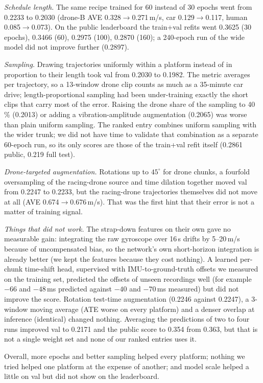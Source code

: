 \documentclass[letterpaper,10pt,conference]{ieeeconf}
\begin{document}
\emph{Schedule length.} The same recipe trained for 60 instead of 30 epochs went from 0.2233 to 0.2030 (drone-B AVE
0.328$\to$0.271\,m/s, car 0.129$\to$0.117, human 0.085$\to$0.073). On the public leaderboard the train+val refits
went 0.3625 (30 epochs), 0.3466 (60), 0.2975 (100), 0.2870 (160); a 240-epoch run of the wide model did not improve
further (0.2897).

\emph{Sampling.} Drawing trajectories uniformly within a platform instead of in proportion to their length took val
from 0.2030 to 0.1982. The metric averages per trajectory, so a 13-window drone clip counts as much as a 35-minute
car drive; length-proportional sampling had been under-training exactly the short clips that carry most of the error.
Raising the drone share of the sampling to 40\,\% (0.2013) or adding a vibration-amplitude augmentation (0.2065) was
worse than plain uniform sampling. The ranked entry combines uniform sampling with the wider trunk; we did not have time to validate
that combination as a separate 60-epoch run, so its only scores are those of the train+val refit itself (0.2861 public,
0.219 full test).

\emph{Drone-targeted augmentation.} Rotations up to $45^\circ$ for drone chunks, a fourfold oversampling of the
racing-drone source and time dilation together moved val from 0.2247 to 0.2233, but the racing-drone trajectories
themselves did not move at all (AVE 0.674$\to$0.676\,m/s). That was the first hint that their error is not a matter
of training signal.

\emph{Things that did not work.} The strap-down features on their own gave no measurable gain: integrating the raw
gyroscope over 16\,s drifts by 5--20\,m/s because of uncompensated bias, so the network's own short-horizon
integration is already better (we kept the features because they cost nothing). A learned per-chunk time-shift
head, supervised with IMU-to-ground-truth offsets we measured on the training set, predicted the offsets of unseen
recordings well (for example $-66$ and $-48$\,ms predicted against $-40$ and $-70$\,ms measured) but did not improve
the score. Rotation test-time augmentation (0.2246 against 0.2247), a 3-window moving average (ATE worse on every
platform) and a denser overlap at inference (identical) changed nothing. Averaging the predictions of two to four
runs improved val to 0.2171 and the public score to 0.354 from 0.363, but that is not a single weight set and none of
our ranked entries uses it.

Overall, more epochs and better sampling helped every platform; nothing we tried helped one platform at the expense
of another; and model scale helped a little on val but did not show on the leaderboard.
\end{document}
